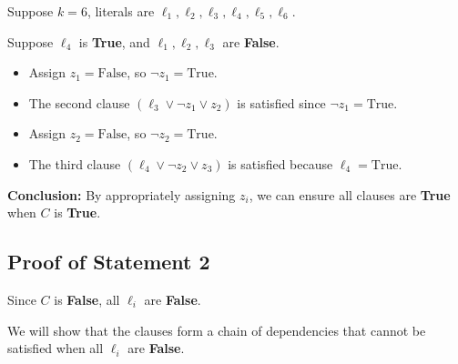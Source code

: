 \documentclass[a4paper]{article}
\begin{document}
Suppose \( k = 6 \), literals are \( \ell_1, \ell_2, \ell_3, \ell_4, \ell_5, \ell_6 \).

Suppose \( \ell_4 \) is \textbf{True}, and \( \ell_1, \ell_2, \ell_3 \) are \textbf{False}.

\begin{itemize}
    \item Assign \( z_1 = \text{False} \), so \( \neg z_1 = \text{True} \).
    \item The second clause \( (\ell_3 \lor \neg z_1 \lor z_2) \) is satisfied since \( \neg z_1 = \text{True} \).
    \item Assign \( z_2 = \text{False} \), so \( \neg z_2 = \text{True} \).
    \item The third clause \( (\ell_4 \lor \neg z_2 \lor z_3) \) is satisfied because \( \ell_4 = \text{True} \).
\end{itemize}

\textbf{Conclusion:} By appropriately assigning \( z_i \), we can ensure all clauses are \textbf{True} when \( C \) is \textbf{True}.

\subsection*{Proof of Statement 2}

Since \( C \) is \textbf{False}, all \( \ell_i \) are \textbf{False}.

We will show that the clauses form a chain of dependencies that cannot be satisfied when all \( \ell_i \) are \textbf{False}.
\end{document}
